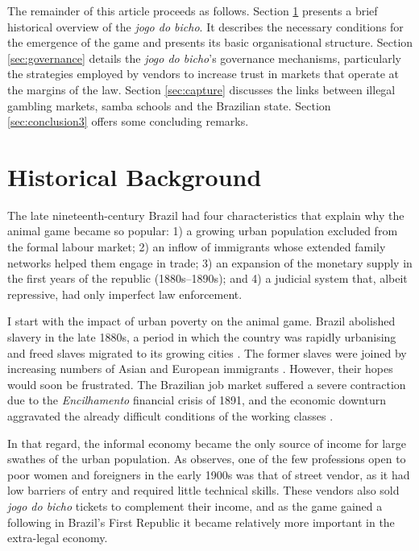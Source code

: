 \documentclass[a4paper,12pt]{article}
\begin{document}
The remainder of this article proceeds as follows. Section \ref{sec:institution} presents a brief historical overview of the \emph{jogo do bicho}. It describes the necessary conditions for the emergence of the game and presents its basic organisational structure. Section \ref{sec:governance} details the \emph{jogo do bicho}'s governance mechanisms, particularly the strategies employed by vendors to increase trust in markets that operate at the margins of the law. Section \ref{sec:capture} discusses the links between illegal gambling markets, samba schools and the Brazilian state. Section \ref{sec:conclusion3} offers some concluding remarks.

\section{Historical Background}
\label{sec:institution}

The late nineteenth-century Brazil had four characteristics that explain why the animal game became so popular: 1) a growing urban population excluded from the formal labour market; 2) an inflow of immigrants whose extended family networks helped them engage in trade; 3) an expansion of the monetary supply in the first years of the republic (1880s--1890s); and 4) a judicial system that, albeit repressive, had only imperfect law enforcement. 

I start with the impact of urban poverty on the animal game. Brazil abolished slavery in the late 1880s, a period in which the country was rapidly urbanising and freed slaves migrated to its growing cities \citep{andrews1991blacks, skidmore1993black}. The former slaves were joined by increasing numbers of Asian and European immigrants \citep{hall1969origins, lesser2013immigration}. However, their hopes would soon be frustrated. The Brazilian job market suffered a severe contraction due to the \emph{Encilhamento} financial crisis of 1891, and the economic downturn aggravated the already difficult conditions of the working classes \citep{topik2014political, triner2005baring}.

In that regard, the informal economy became the only source of income for large swathes of the urban population. As \citet[115]{chazkel2011laws} observes, one of the few professions open to poor women and foreigners in the early 1900s was that of street vendor, as it had low barriers of entry and required little technical skills. These vendors also sold \emph{jogo do bicho} tickets to complement their income, and as the game gained a following in Brazil's First Republic it became relatively more important in the extra-legal economy.  
\end{document}
